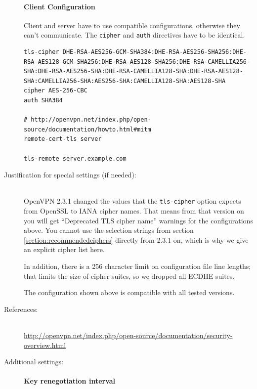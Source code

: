 \begin{description}
\paragraph{Client Configuration}\mbox{}

Client and server have to use compatible configurations, otherwise they can't communicate.
The \verb|cipher| and \verb|auth| directives have to be identical.

\begin{lstlisting}[breaklines]
tls-cipher DHE-RSA-AES256-GCM-SHA384:DHE-RSA-AES256-SHA256:DHE-RSA-AES128-GCM-SHA256:DHE-RSA-AES128-SHA256:DHE-RSA-CAMELLIA256-SHA:DHE-RSA-AES256-SHA:DHE-RSA-CAMELLIA128-SHA:DHE-RSA-AES128-SHA:CAMELLIA256-SHA:AES256-SHA:CAMELLIA128-SHA:AES128-SHA
cipher AES-256-CBC
auth SHA384

# http://openvpn.net/index.php/open-source/documentation/howto.html#mitm
remote-cert-tls server

tls-remote server.example.com
\end{lstlisting}

\item[Justification for special settings (if needed):] \mbox{}\\

OpenVPN 2.3.1 changed the values that the \verb|tls-cipher| option
expects from OpenSSL to IANA cipher names. That means from that
version on you will get ``Deprecated TLS cipher name'' warnings for
the configurations above. You cannot use the selection strings from
section \ref{section:recommendedciphers} directly from 2.3.1 on, which
is why we give an explicit cipher list here.

In addition, there is a 256 character limit on configuration file line
lengths; that limits the size of cipher suites, so we dropped all
ECDHE suites.

The configuration shown above is compatible with all tested versions.

\item[References:] \mbox{}\\

\url{http://openvpn.net/index.php/open-source/documentation/security-overview.html}



\item[Additional settings:] \mbox{}

\paragraph{Key renegotiation interval}\mbox{}


\end{description}
